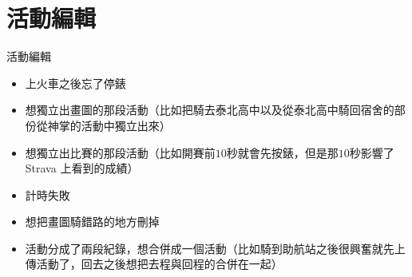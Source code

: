 \section{活動編輯}

\begin{frame}{活動編輯}
\begin{itemize}
\item 上火車之後忘了停錶\pause
\item 想獨立出畫圖的那段活動（比如把騎去泰北高中以及從泰北高中騎回宿舍的部份從神掌的活動中獨立出來）\pause
\item 想獨立出比賽的那段活動（比如開賽前$10$秒就會先按錶，但是那$10$秒影響了 Strava 上看到的成績）\pause
\item 計時失敗\pause
\item 想把畫圖騎錯路的地方刪掉\pause
\item 活動分成了兩段紀錄，想合併成一個活動（比如騎到助航站之後很興奮就先上傳活動了，回去之後想把去程與回程的合併在一起）
\end{itemize}
\end{frame}

